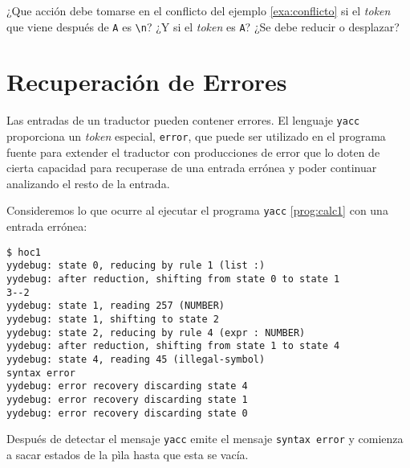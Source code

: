 \begin{exercise}
¿Que acción debe tomarse en el conflicto del ejemplo \ref{exa:conflicto} 
si el \emph{token} que viene después de \verb|A| es \verb|\n|?
¿Y si el \emph{token} es \verb|A|? ¿Se debe reducir o desplazar?
\end{exercise}

\section{Recuperación de Errores}
\label{section:recuperryacc}
Las entradas de un traductor pueden contener errores. 
El lenguaje \verb|yacc| proporciona un \emph{token} especial,
\verb|error|, que puede ser utilizado en el programa fuente
para extender el traductor con producciones de error 
que lo doten de cierta capacidad para 
recuperase de  una entrada errónea y poder continuar 
analizando el resto de la entrada.
\begin{execution}
Consideremos lo que ocurre al ejecutar el programa \verb|yacc|
\ref{prog:calc1} con una entrada errónea:
\begin{verbatim}
$ hoc1
yydebug: state 0, reducing by rule 1 (list :)
yydebug: after reduction, shifting from state 0 to state 1
3--2
yydebug: state 1, reading 257 (NUMBER)
yydebug: state 1, shifting to state 2
yydebug: state 2, reducing by rule 4 (expr : NUMBER)
yydebug: after reduction, shifting from state 1 to state 4
yydebug: state 4, reading 45 (illegal-symbol)
syntax error
yydebug: error recovery discarding state 4
yydebug: error recovery discarding state 1
yydebug: error recovery discarding state 0
\end{verbatim}
\end{execution}

Después de detectar el mensaje \verb|yacc| emite el mensaje 
\verb|syntax error| y comienza a sacar estados de la pìla hasta que esta se vacía.


